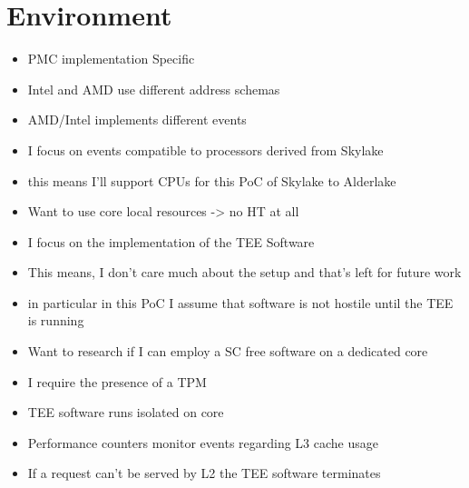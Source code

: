 \section{Environment}
\begin{itemize}
    \item PMC implementation Specific
    \item Intel and AMD use different address schemas
    \item AMD/Intel implements different events
    \item I focus on events compatible to processors derived from Skylake
    \item this means I'll support CPUs for this PoC of Skylake to Alderlake
    \item Want to use core local resources -> no HT at all
    \item I focus on the implementation of the TEE Software
    \item This means, I don't care much about the setup and that's left for
          future work
    \item in particular in this PoC I assume that software is not hostile until
          the TEE is running
    \item Want to research if I can employ a SC free software on a dedicated core
    \item I require the presence of a TPM
    \item TEE software runs isolated on core
    \item Performance counters monitor events regarding L3 cache usage
    \item If a request can't be served by L2 the TEE software terminates
\end{itemize}

